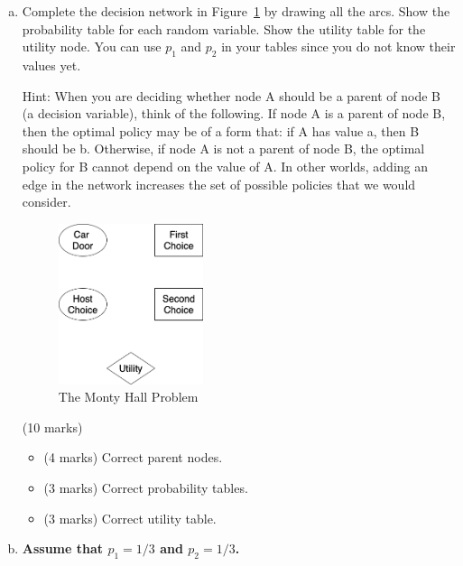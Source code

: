 \documentclass[12pt]{article}
\begin{document}
\begin{enumerate}[(a)]

\item     
Complete the decision network in Figure~\ref{fig:monty_hall} by drawing all the arcs. Show the probability table for each random variable. Show the utility table for the utility node. You can use $p_1$ and $p_2$ in your tables since you do not know their values yet.

Hint: When you are deciding whether node A should be a parent of node B (a decision variable), think of the following. If node A is a parent of node B, then the optimal policy may be of a form that: if A has value a, then B should be b. Otherwise, if node A is not a parent of node B, the optimal policy for B cannot depend on the value of A. In other worlds, adding an edge in the network increases the set of possible policies that we would consider. 
    
\begin{figure}[ht!]
\centering
\includegraphics[width=0.4\textwidth]{images_posted/a4-dn1-empty.png}
\caption{The Monty Hall Problem}
\label{fig:monty_hall}
\end{figure}
    
\begin{markscheme}

(10 marks)

\begin{itemize}
    \item (4 marks) Correct parent nodes.
    \item (3 marks) Correct probability tables.
    \item (3 marks) Correct utility table.
\end{itemize}

\end{markscheme}


\item

{\bf Assume that $p_1 = 1/3$ and $p_2 = 1/3$.}  


\end{enumerate}
\end{document}
